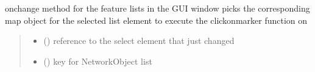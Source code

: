 \documentclass[letterpaper,10pt,english]{sphinxmanual}
\begin{document}

\begin{fulllineitems}
\label{\detokenize{docs_gui/js_api/urbs_results/setup_urbs_results:fillSelectedUrbsNetworkFeatureEditor}}
\pysigstartsignatures
{}
\pysigstopsignatures
\sphinxAtStartPar
onchange method for the feature lists in the GUI window
picks the corresponding map object for the selected list element to execute the clickonmarker function on
\begin{quote}\begin{description}
\begin{itemize}
\item {} 
\sphinxAtStartPar
{} () \textendash{} reference to the select element that just changed

\item {} 
\sphinxAtStartPar
{} () \textendash{} key for NetworkObject list

\end{itemize}

\end{description}\end{quote}

\end{fulllineitems}

\end{document}
